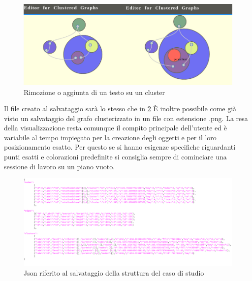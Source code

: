 {\begin{figure}[!htb]
	\begin{center}
		\vspace{1cm}
		\includegraphics[width=1 \linewidth]{figure/deleteOrAddText}
	\end{center}
	\caption{Rimozione o aggiunta di un testo su un cluster\label{fig:deleteOrAddText}}
\end{figure}
\newline
Il file creato al salvataggio sarà lo stesso che in \figurename{\ref{fig:saveJson}} È inoltre possibile come già visto un salvataggio del grafo clusterizzato in un file con estensione .png. La resa della visualizzazione resta comunque il compito principale dell'utente ed è variabile al tempo impiegato per la creazione degli oggetti e per il loro posizionamento esatto. Per questo se si hanno esigenze specifiche riguardanti punti esatti e colorazioni predefinite si consiglia sempre di cominciare una sessione di lavoro su un piano vuoto.
\begin{figure}[!htb]
	\begin{center}
		\vspace{1cm}
		\includegraphics[width=1 \linewidth]{figure/saveJson}
	\end{center}
	\caption{Json riferito al salvataggio della struttura del caso di studio\label{fig:saveJson}}
\end{figure}
\newpage
}
